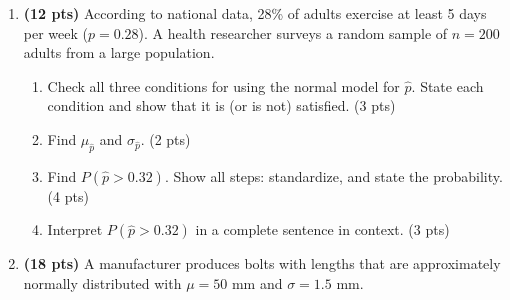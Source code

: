 \documentclass[10pt]{article}
\begin{document}
\begin{enumerate}[resume]

  \item \textbf{(12 pts)} According to national data, 28\% of adults exercise at least
        5 days per week ($p = 0.28$). A health researcher surveys a random sample of
        $n = 200$ adults from a large population.

        \begin{enumerate}[label=(\alph*)]
          \item Check all three conditions for using the normal model for $\hat{p}$.
                State each condition and show that it is (or is not) satisfied. \hfill (3 pts)
                \vspace{1.3in}
          \item Find $\mu_{\hat{p}}$ and $\sigma_{\hat{p}}$. \hfill (2 pts)
                \vspace{0.8in}
          \item Find $P(\hat{p} > 0.32)$. Show all steps: standardize, and state the
                probability. \hfill (4 pts)
                \vspace{1.2in}
          \item Interpret $P(\hat{p} > 0.32)$ in a complete sentence in context. \hfill (3 pts)
        \end{enumerate}

  \item \textbf{(18 pts)} A manufacturer produces bolts with lengths that are approximately
        normally distributed with $\mu = 50$ mm and $\sigma = 1.5$ mm.


\end{enumerate}
\end{document}
